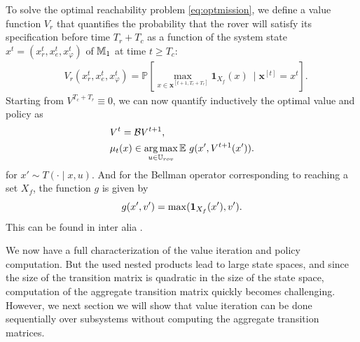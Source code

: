 \documentclass[conference]{IEEEtran}
\renewcommand{\cite}[1]{\citep{#1}}
\begin{document}
To solve the optimal reachability problem \eqref{eq:optmission}, we define a value function $V_r$ that quantifies the probability that the rover will satisfy its specification before time $T_r + T_c$ as a function of the system state $x^{t}=(x^{t}_r, x^{t}_e, x^{t}_\varphi)$ of $\mathbb{M}_1$ at time $t\geq T_c$:
\begin{equation}
\label{eq:rovervalue}
\begin{aligned}
	& V_r(x^{t}_r, x^{t}_e, x^{t}_\varphi)  = \mathbb{P} \left[\max_{x\in \mathbf{x}^{[t+1,T_c+T_r]}} \mathbf 1_{X_f}(x) \ \mid \mathbf{x}^{[t]} = x^{t} \right].
\end{aligned}
\end{equation}
Starting from $ V^{T_c+T_r}\equiv 0$, we can now quantify inductively the optimal value and policy as
\begin{subequations}
\label{eq:value_iter_mission}
  \begin{align} 
    & V^{t}  = \bellman V^{t+1} \label{eq:iter}, \\
    & \pol_t(x) \in \argmax_{u\in \U_{rov}} \mathbb E\, \,g(x', V^{t+1}(x')) .  \end{align}
\end{subequations}
 for $x'\sim  T(\cdot \mid x, u)$.
And 
  for the Bellman operator corresponding to reaching a set $X_f$, the function $g$ is given by
  \begin{equation}
  \label{eq:bellman_reach}
    g(x', v') = \max( \ind_{X_f}(x'), v').
  \end{equation}
This can be found in inter alia \cite{Abate2008}.

 
We now have a full characterization of the value iteration and policy computation. But the used nested products lead to large state spaces, and since the size of the transition matrix is quadratic in the size of the state space, computation of the aggregate transition matrix quickly becomes challenging. However, we next section we will show that value iteration can be done sequentially over subsystems without computing the aggregate transition matrices.


\end{document}
